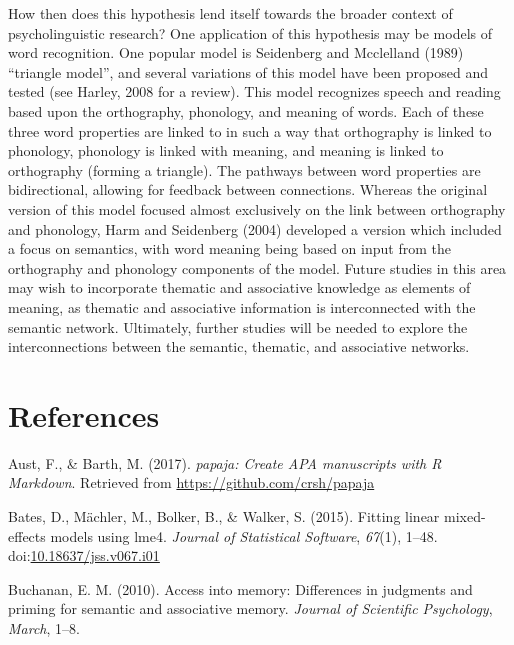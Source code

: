 \documentclass[english,man]{apa6}
\theoremstyle{definition}
\theoremstyle{definition}
\theoremstyle{definition}
\theoremstyle{remark}
\begin{document}
How then does this hypothesis lend itself towards the broader context of
psycholinguistic research? One application of this hypothesis may be
models of word recognition. One popular model is Seidenberg and
Mcclelland (1989) \enquote{triangle model}, and several variations of
this model have been proposed and tested (see Harley, 2008 for a
review). This model recognizes speech and reading based upon the
orthography, phonology, and meaning of words. Each of these three word
properties are linked to in such a way that orthography is linked to
phonology, phonology is linked with meaning, and meaning is linked to
orthography (forming a triangle). The pathways between word properties
are bidirectional, allowing for feedback between connections. Whereas
the original version of this model focused almost exclusively on the
link between orthography and phonology, Harm and Seidenberg (2004)
developed a version which included a focus on semantics, with word
meaning being based on input from the orthography and phonology
components of the model. Future studies in this area may wish to
incorporate thematic and associative knowledge as elements of meaning,
as thematic and associative information is interconnected with the
semantic network. Ultimately, further studies will be needed to explore
the interconnections between the semantic, thematic, and associative
networks.

\newpage

\section{References}\label{references}

\setlength{\parindent}{-0.5in} \setlength{\leftskip}{0.5in}

\hypertarget{refs}{}
\hypertarget{ref-R-papaja}{}
Aust, F., \& Barth, M. (2017). \emph{papaja: Create APA manuscripts with
R Markdown}. Retrieved from \url{https://github.com/crsh/papaja}

\hypertarget{ref-Bates2015}{}
Bates, D., Mächler, M., Bolker, B., \& Walker, S. (2015). Fitting linear
mixed-effects models using lme4. \emph{Journal of Statistical Software},
\emph{67}(1), 1--48.
doi:\href{https://doi.org/10.18637/jss.v067.i01}{10.18637/jss.v067.i01}

\hypertarget{ref-Buchanan2010}{}
Buchanan, E. M. (2010). Access into memory: Differences in judgments and
priming for semantic and associative memory. \emph{Journal of Scientific
Psychology}, \emph{March}, 1--8.
\end{document}
